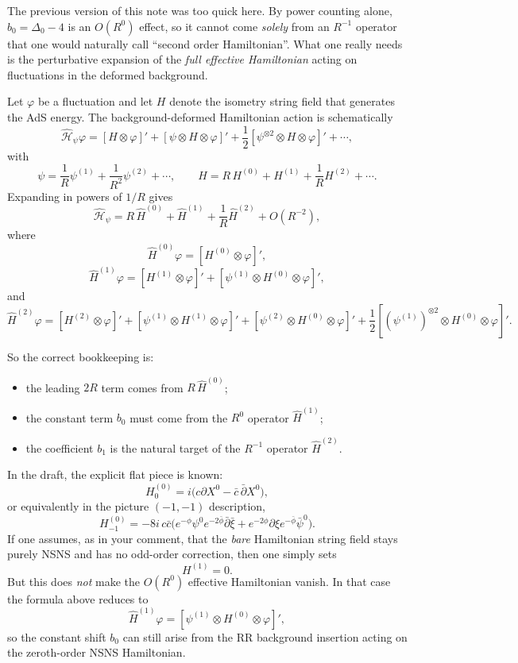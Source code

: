\documentclass[12pt]{article}
\def\be{\begin{equation}}
\def\ee{\end{equation}}
\newcommand{\D}{\ensuremath{\Delta}}
\begin{document}
The previous version of this note was too quick here. By power counting alone,
$b_0=\D_0-4$ is an $O(R^0)$ effect, so it cannot come \emph{solely} from an
$R^{-1}$ operator that one would naturally call ``second order Hamiltonian''.
What one really needs is the perturbative expansion of the \emph{full effective Hamiltonian}
acting on fluctuations in the deformed background.

Let $\varphi$ be a fluctuation and let $H$ denote the isometry string field that generates the
AdS energy. The background-deformed Hamiltonian action is schematically
\be
\widehat{\mathcal H}_{\psi}\varphi
=[H\otimes \varphi]'+[\psi\otimes H\otimes\varphi]'+\frac{1}{2}[\psi^{\otimes 2}\otimes H\otimes\varphi]'+\cdots,
\ee
with
\be
\psi=\frac{1}{R}\psi^{(1)}+\frac{1}{R^2}\psi^{(2)}+\cdots,
\qquad
H=R\,H^{(0)}+H^{(1)}+\frac{1}{R}H^{(2)}+\cdots .
\ee
Expanding in powers of $1/R$ gives
\be
\widehat{\mathcal H}_{\psi}
=R\,\widehat H^{(0)}+\widehat H^{(1)}+\frac{1}{R}\widehat H^{(2)}+O(R^{-2}),
\ee
where
\be
\widehat H^{(0)}\varphi=[H^{(0)}\otimes\varphi]',
\ee
\be
\widehat H^{(1)}\varphi
= [H^{(1)}\otimes\varphi]'
 + [\psi^{(1)}\otimes H^{(0)}\otimes\varphi]',
\ee
and
\be
\widehat H^{(2)}\varphi
= [H^{(2)}\otimes\varphi]'
 + [\psi^{(1)}\otimes H^{(1)}\otimes\varphi]'
 + [\psi^{(2)}\otimes H^{(0)}\otimes\varphi]'
 + \frac{1}{2}[(\psi^{(1)})^{\otimes 2}\otimes H^{(0)}\otimes\varphi]'.
\ee

So the correct bookkeeping is:
\begin{itemize}
\item the leading $2R$ term comes from $R\,\widehat H^{(0)}$;
\item the constant term $b_0$ must come from the $R^0$ operator $\widehat H^{(1)}$;
\item the coefficient $b_1$ is the natural target of the $R^{-1}$ operator $\widehat H^{(2)}$.
\end{itemize}

In the draft, the explicit flat piece is known:
\be
H^{(0)}_{0}= i\big(c\partial X^0-\bar c\,\bar\partial X^0\big),
\ee
or equivalently in the picture $(-1,-1)$ description,
\be
H^{(0)}_{-1}
=-8i\,c\bar c\Big(e^{-\phi}\psi^{0}e^{-2\bar\phi}\bar\partial\bar\xi
+e^{-2\phi}\partial\xi e^{-\bar\phi}\bar\psi^{0}\Big).
\ee
If one assumes, as in your comment, that the \emph{bare} Hamiltonian string field stays purely NSNS
and has no odd-order correction, then one simply sets
\be
H^{(1)}=0.
\ee
But this does \emph{not} make the $O(R^0)$ effective Hamiltonian vanish. In that case the formula above
reduces to
\be
\widehat H^{(1)}\varphi=[\psi^{(1)}\otimes H^{(0)}\otimes\varphi]',
\ee
so the constant shift $b_0$ can still arise from the RR background insertion acting on the
zeroth-order NSNS Hamiltonian.
\end{document}
